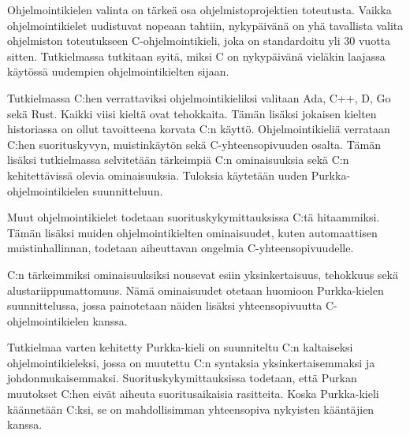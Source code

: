 Ohjelmointikielen valinta on tärkeä osa ohjelmistoprojektien toteutusta. Vaikka
ohjelmointikielet uudistuvat nopeaan tahtiin, nykypäivänä on yhä tavallista
valita ohjelmiston toteutukseen C-ohjelmointikieli, joka on standardoitu yli 30
vuotta sitten. Tutkielmassa tutkitaan syitä, miksi C on nykypäivänä vieläkin
laajassa käytössä uudempien ohjelmointikielten sijaan.

Tutkielmassa C:hen verrattaviksi ohjelmointikieliksi valitaan Ada, C++, D,
Go sekä Rust. Kaikki viisi kieltä ovat tehokkaita. Tämän lisäksi jokaisen
kielten historiassa on ollut tavoitteena korvata C:n käyttö.
Ohjelmointikieliä verrataan C:hen suorituskyvyn, muistinkäytön sekä
C-yhteensopivuuden osalta. Tämän lisäksi tutkielmassa selvitetään
tärkeimpiä C:n ominaisuuksia sekä C:n kehitettävissä olevia ominaisuuksia.
Tuloksia käytetään uuden Purkka-ohjelmointikielen suunnitteluun.

Muut ohjelmointikielet todetaan suorituskykymittauksissa C:tä hitaammiksi.
Tämän lisäksi muiden ohjelmointikielten ominaisuudet, kuten automaattisen
muistinhallinnan, todetaan aiheuttavan ongelmia C-yhteensopivuudelle.

C:n tärkeimmiksi ominaisuuksiksi nousevat esiin yksinkertaisuus, tehokkuus
sekä alustariippumattomuus. Nämä ominaisuudet otetaan huomioon
Purkka-kielen suunnittelussa, jossa painotetaan näiden lisäksi
yhteensopivuutta C-ohjelmointikielen kanssa.

Tutkielmaa varten kehitetty Purkka-kieli on suunniteltu C:n kaltaiseksi
ohjelmointikieleksi, jossa on muutettu C:n syntaksia yksinkertaisemmaksi ja
johdonmukaisemmaksi. Suorituskykymittauksissa todetaan, että Purkan muutokset
C:hen eivät aiheuta suoritusaikaisia rasitteita. Koska Purkka-kieli käännetään
C:ksi, se on mahdollisimman yhteensopiva nykyisten kääntäjien kanssa.
